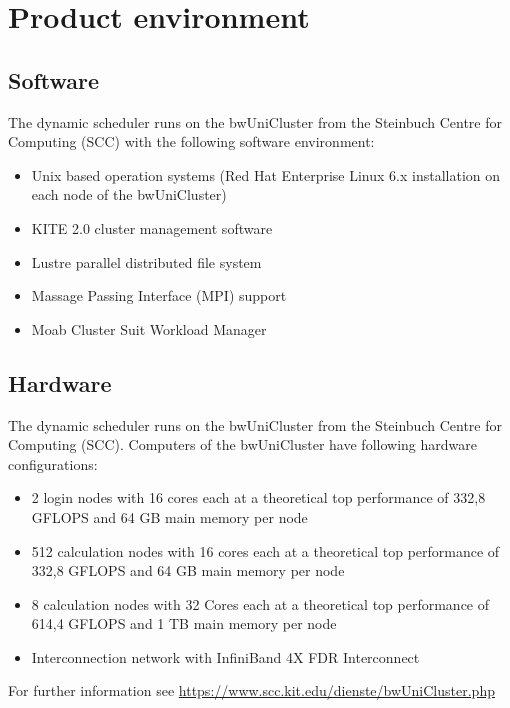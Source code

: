 \section{Product environment}
	\subsection{Software}
	The dynamic scheduler runs on the bwUniCluster from the Steinbuch Centre for Computing (SCC) with the following software environment:
	\begin{itemize}
		\item Unix based operation systems (Red Hat Enterprise Linux 6.x installation on each node of the bwUniCluster)
		\item KITE 2.0 cluster management software
		\item Lustre parallel distributed file system
		\item Massage Passing Interface (MPI) support
		\item Moab Cluster Suit Workload Manager
	\end{itemize}
	\subsection{Hardware}
	The dynamic scheduler runs on the bwUniCluster from the Steinbuch Centre for Computing (SCC). Computers of the bwUniCluster have following hardware configurations:
		\begin{itemize}
			\item 2 login nodes with 16 cores each at a theoretical top performance of 332,8 GFLOPS and 64 GB main memory per node 
			\item 512 calculation nodes with 16 cores each at a theoretical top performance of 332,8 GFLOPS and 64 GB main memory per node
			\item 8 calculation nodes with 32 Cores each at a theoretical top performance of 614,4 GFLOPS and 1 TB main memory per node
			\item Interconnection network with InfiniBand 4X FDR Interconnect
		\end{itemize}
		For further information see \href{https://www.scc.kit.edu/dienste/bwUniCluster.php}{https://www.scc.kit.edu/dienste/bwUniCluster.php}
    
 